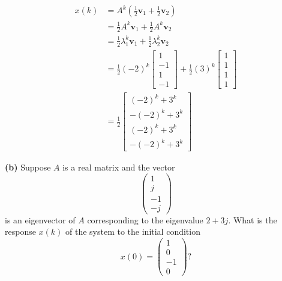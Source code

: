 \documentclass[12pt,a4paper]{article}
\begin{document}
\begin{align*}
	x(k) &= A^k \left( \frac{1}{2}\mathbf{v}_1 + \frac{1}{2}\mathbf{v}_2 \right) \\
	&= \frac{1}{2} A^k \mathbf{v}_1 + \frac{1}{2} A^k \mathbf{v}_2 \\
	&= \frac{1}{2} \lambda_1^k \mathbf{v}_1 + \frac{1}{2} \lambda_2^k \mathbf{v}_2 \\
	&= \frac{1}{2} (-2)^k \begin{bmatrix} 1 \\ -1 \\ 1 \\ -1 \end{bmatrix} + \frac{1}{2} (3)^k \begin{bmatrix} 1 \\ 1 \\ 1 \\ 1 \end{bmatrix} \\
	&= \frac{1}{2} \begin{bmatrix}
		(-2)^k + 3^k \\
		-(-2)^k + 3^k \\
		(-2)^k + 3^k \\
		-(-2)^k + 3^k
	\end{bmatrix}
\end{align*}

\textbf{(b)} Suppose $A$ is a real matrix and the vector
\[\begin{pmatrix}1\\j\\-1\\-j\end{pmatrix}\]
is an eigenvector of $A$ corresponding to the eigenvalue $2+3j$. What is the response $x(k)$ of the system to the initial condition
\[x(0)=\begin{pmatrix}1\\0\\-1\\0\end{pmatrix}?\]
\end{document}
